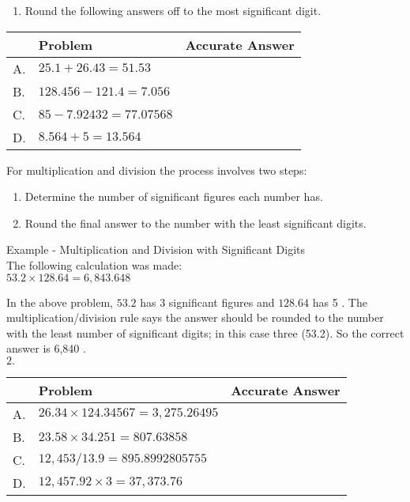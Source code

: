 \begin{enumerate}
  \item Round the following answers off to the most significant digit.
\end{enumerate}
\begin{tabular}{|l|l|l|}
\hline
 & Problem & Accurate Answer \\
\hline
A. & $25.1+26.43=51.53$ &  \\
\hline
B. & $128.456-121.4=7.056$ &  \\
\hline
C. & $85-7.92432=77.07568$ &  \\
\hline
D. & $8.564+5=13.564$ &  \\
\hline
\end{tabular}

For multiplication and division the process involves two steps:\\
\begin{enumerate}
  \item Determine the number of significant figures each number has.

  \item Round the final answer to the number with the least significant digits.

\end{enumerate}
Example - Multiplication and Division with Significant Digits\\
The following calculation was made:\\

$53.2 \times 128.64=6,843.648$

In the above problem, $53.2$ has 3 significant figures and $128.64$ has 5 . The multiplication/division rule says the answer should be rounded to the number with the least number of significant digits; in this case three (53.2). So the correct answer is 6,840 .\\

$2 .$\\

\begin{tabular}{|l|l|l|}
\hline
 & Problem & Accurate Answer \\
\hline
A. & $26.34 \times 124.34567=3,275.26495$ &  \\
\hline
B. & $23.58 \times 34.251=807.63858$ &  \\
\hline
C. & $12,453 / 13.9=895.8992805755$ &  \\
\hline
D. & $12,457.92 \times 3=37,373.76$ &  \\
\hline
\end{tabular}

